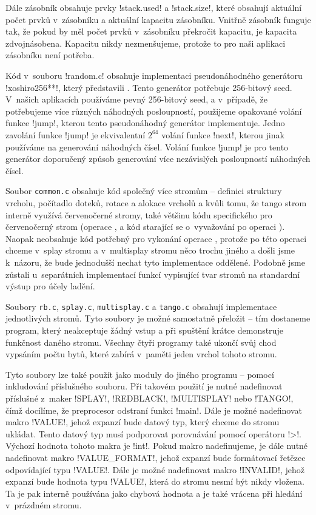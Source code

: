 Dále zásobník obsahuje prvky !stack.used! a !stack.size!, které obsahují
aktuální počet prvků v~zásobníku a aktuální kapacitu zásobníku. Vnitřně
zásobník funguje tak, že pokud by měl počet prvků v~zásobníku překročit
kapacitu, je kapacita zdvojnásobena. Kapacitu nikdy nezmenšujeme, protože to
pro naši aplikaci zásobníku není potřeba.

Kód v~souboru !random.c! obsahuje implementaci pseudonáhodného generátoru
!xoshiro256**!, který představili \citet{xoshiro}. Tento generátor potřebuje 256-bitový seed. V~našich aplikacích
používáme pevný 256-bitový seed, a v~případě, že potřebujeme více různých
náhodných posloupností, použijeme opakované volání funkce !jump!, kterou tento
pseudonáhodný generátor implementuje. Jedno zavolání funkce !jump! je
ekvivalentní $2^{64}$ volání funkce !next!, kterou jinak používáme na generování náhodných čísel. Volání funkce !jump! je pro tento
generátor doporučený způsob generování více nezávislých posloupností náhodných
čísel.

Soubor {\tt common.c} obsahuje kód společný více
stromům -- definici struktury vrcholu, počítadlo doteků, rotace a alokace vrcholů a kvůli
tomu, že tango strom interně využívá červenočerné stromy, také většinu kódu
specifického pro červenočerný strom (operace ,  a kód
starající se o~vyvažování po operaci ). Naopak neobsahuje kód
potřebný pro vykonání operace , protože po této operaci chceme
v~splay stromu a v~multisplay stromu něco trochu jiného a došli jsme k~názoru, že
bude jednodušší nechat tyto implementace oddělené. Podobně jsme zůstali
u~separátních implementací funkcí vypisující tvar stromů na standardní výstup pro
účely ladění.

Soubory {\tt rb.c}, {\tt splay.c}, {\tt multisplay.c} a {\tt tango.c} obsahují
implementace jednotlivých stromů. Tyto soubory je možné samostatně přeložit --
tím dostaneme program, který neakceptuje žádný vstup a při spuštění krátce
demonstruje funkčnost daného stromu. Všechny čtyři programy také ukončí svůj
chod vypsáním počtu bytů, které zabírá v~paměti jeden vrchol tohoto stromu.

Tyto soubory lze také použít jako moduly do jiného programu -- pomocí inkludování příslušného souboru. Při takovém použití je nutné nadefinovat příslušné z~maker
!SPLAY!, !REDBLACK!, !MULTISPLAY! nebo !TANGO!, čímž docílíme, že preprocesor
odstraní funkci !main!. Dále je možné nadefinovat makro !VALUE!, jehož expanzí
bude datový typ, který chceme do stromu ukládat. Tento datový typ musí
podporovat porovnávání pomocí operátoru !>!. Výchozí hodnota tohoto makra je
!int!. Pokud makro nadefinujeme, je dále nutné nadefinovat makro
!VALUE_FORMAT!, jehož expanzí bude formátovací řetězec odpovídající typu
!VALUE!. Dále je možné nadefinovat makro !INVALID!, jehož expanzí bude hodnota
typu !VALUE!, která do stromu nesmí být nikdy vložena. Ta je pak interně
používána jako chybová hodnota a je také vrácena při hledání v~prázdném stromu.

